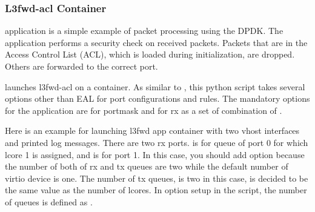 \documentclass[a4paper,11pt,openany,oneside,english]{sphinxmanual}
\begin{document}
\subsubsection{L3fwd-acl Container}
\label{\detokenize{tools/sppc/app_launcher:l3fwd-acl-container}}\label{\detokenize{tools/sppc/app_launcher:sppc-appl-l3fwd-acl}}
application is a simple example of packet processing using the DPDK.
The application performs a security check on received packets.
Packets that are in the Access Control List (ACL), which is loaded
during initialization, are dropped. Others are forwarded to the correct
port.

 launches l3fwd-acl on a container.
As similar to , this python script takes several options
other than EAL for port configurations and rules.
The mandatory options for the application are  for portmask
and  for rx as a set of combination of
.

Here is an example for launching l3fwd app container with two vhost
interfaces and printed log messages.
There are two rx ports.  is for queue of port 0 for which
lcore 1 is assigned, and  is for port 1.
In this case, you should add  option because the number of both
of rx and tx queues are two while the default number of virtio device
is one.
The number of tx queues, is two in this case, is decided to be the same
value as the number of lcores.
In  option setup in the script, the number of queues is
defined as .
\end{document}
